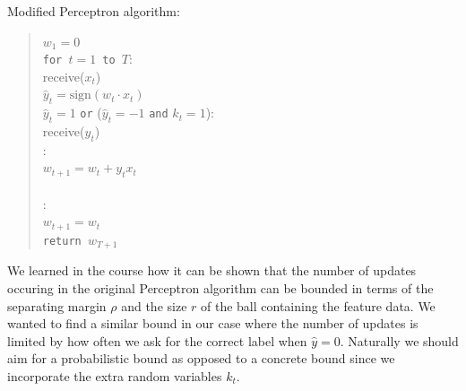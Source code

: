 \documentclass[12pt]{article}
\begin{document}
\noindent Modified Perceptron algorithm:
\begin{quotation}
\noindent $w_1=0$\\
{\tt for $t=1$ to $T$}:\\
\indent receive($x_t$)\\
\indent $\widehat{y}_t=\mbox{sign}(w_t\cdot x_t)$\\
 $\widehat{y}_t =1$ {\tt or} ($\widehat{y}_t =-1$ {\tt and} $k_t = 1$):\\
\indent\indent receive($y_t$)\\
\indent{}:\\
\indent\indent\indent $w_{t+1} = w_t + y_t x_t$\\
\indent{}\\
:\\
\indent\indent $w_{t+1} = w_t$\\
{\tt return $w_{T+1}$}

\end{quotation}

We learned in the course how it can be shown that the number of updates occuring in the original Perceptron algorithm can be bounded in terms of the separating margin $\rho$ and the size $r$ of the ball containing the feature data. We wanted to find a similar bound in our case where the number of updates is limited by how often we ask for the correct label when $\widehat y = 0$. Naturally we should aim for a probabilistic bound as opposed to a concrete bound since we incorporate the extra random variables $k_t$.
\end{document}
